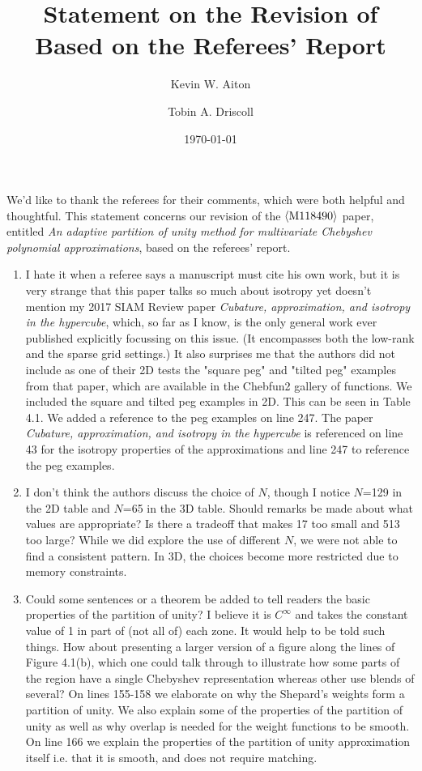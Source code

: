 \documentclass[10pt]{article}
\title{Statement on the Revision of \meta{M118490} \\
  Based on the Referees' Report}
\author{Kevin W. Aiton \and Tobin A. Driscoll}
\date{\today}
\newcommand\meta[1]{$\langle\hbox{#1}\rangle$}
\begin{document}
We'd like to thank the referees for their comments, which were both helpful and thoughtful. This statement concerns our revision of the \meta{M118490} paper,
entitled \textit{An adaptive partition of unity method for multivariate Chebyshev polynomial approximations}, based on the referees' report.

\begin{enumerate}
\item \begin{response}{  I hate it when a referee says a manuscript must cite his own work, but it is very strange that this paper
talks so much about isotropy yet doesn't mention my 2017
SIAM Review paper \textit{Cubature, approximation, and isotropy
in the hypercube}, which, so far as I know, is the only
general work ever published explicitly focussing on this
issue. (It encompasses both the low-rank and the sparse
grid settings.) It also surprises me that the authors did
not include as one of their 2D tests the "square peg" and
"tilted peg" examples from that paper, which are available
in the Chebfun2 gallery of functions. }
We included the square and tilted peg examples in 2D. This can be seen in Table 4.1. We added a reference to the peg examples on line 247. The paper \textit{Cubature, approximation, and isotropy in the hypercube} is referenced on line 43 for the isotropy properties of the approximations and line 247 to reference the peg examples.
\end{response}

\item \begin{response}{ I don't think the authors discuss the choice of $N$, though I notice $N$=129 in the 2D table and $N$=65 in the
3D table. Should remarks be made about what values are
appropriate? Is there a tradeoff that makes 17 too small
and 513 too large? }
While we did explore the use of different $N$, we were not able to find a consistent pattern. In 3D, the choices become more restricted due to memory constraints.
\end{response}

\item \begin{response}{ Could some sentences or a theorem be added to tell readers the basic properties of the partition of unity?
I believe it is $C^{\infty}$ and takes the constant value of
1 in part of (not all of) each zone. It would help to be
told such things. How about presenting a larger version
of a figure along the lines of Figure 4.1(b), which one
could talk through to illustrate how some parts of the
region have a single Chebyshev representation whereas
other use blends of several?}
On lines 155-158 we elaborate on why the Shepard's weights form a partition of unity. We also explain some of the properties of the partition of unity as well as why overlap is needed for the weight functions to be smooth. On line 166 we explain the properties of the partition of unity approximation itself i.e. that it is smooth, and does not require matching.


\end{response}
\end{enumerate}
\end{document}
